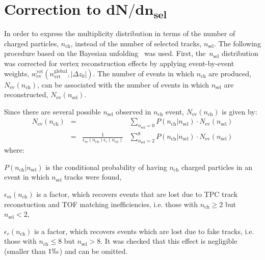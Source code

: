 \section[Correction to $dN/dn_\textrm{sel}$]{Correction to $\mathbf{dN/dn_\textrm{sel}}$}\label{section:star_dNdnch}
In order to express the multiplicity distribution in terms of the number of charged particles, $n_\textrm{ch}$, instead of the number of selected tracks, $n_\textrm{sel}$.%
The  following procedure based on the Bayesian unfolding~\cite{unfolding:2016mok,unfolding:DAgostini} was used. First, the~$n_\textrm{sel}$ distribution was corrected for vertex reconstruction effects by applying event-by-event weights, $w_\textrm{ev}^\textrm{vrt}(n_\textrm{vrt}^\textrm{global},|\Delta z_0|)$. The number of events in which $n_\textrm{ch}$ are produced, $N_\textrm{ev}(n_\textrm{ch})$, can be associated with the number of events in which $n_\textrm{sel}$ are reconstructed, $N_\textrm{ev}(n_\textrm{sel})$.

Since there are several possible $n_\textrm{sel}$ observed in  $n_\textrm{ch}$ event,  $N_\textrm{ev}(n_\textrm{ch})$ is given by:
\begin{equation}
\begin{array}{ccccc}
N_\textrm{ev}(n_\textrm{ch})&=&&\displaystyle\sum_{n_\textrm{sel}=0}P(n_\textrm{ch}|n_\textrm{sel})\cdot N_\textrm{ev}(n_\textrm{sel})\\
&=&\frac{1}{\epsilon_{m}(n_\textrm{ch})\epsilon_{r}(n_\textrm{ch})}&\displaystyle\sum_{n_\textrm{sel}=2}^{8}P(n_\textrm{ch}|n_\textrm{sel})\cdot N_\textrm{ev}(n_\textrm{sel})
\end{array}
\end{equation}
where:
\begin{description}
	\item $P(n_\textrm{ch}|n_\textrm{sel})$ is the conditional probability of having $n_\textrm{ch}$ charged particles in an event in which  $n_\textrm{sel}$ tracks were found,
	\item $\epsilon_{m}(n_\textrm{ch})$ is a factor, which recovers events that are lost due to TPC track reconstuction and  TOF matching inefficiencies, i.e. those with $n_\textrm{ch}\geq2$ but $n_\textrm{sel}<2$,
	\item $\epsilon_{r}(n_\textrm{ch})$ is a factor, which recovers  events which are lost due to fake tracks, i.e. those with $n_\textrm{ch}\leq 8$ but $n_\textrm{sel}> 8$. It was checked that this effect is negligible (smaller than $1\permil$) and can be omitted. 
\end{description}
